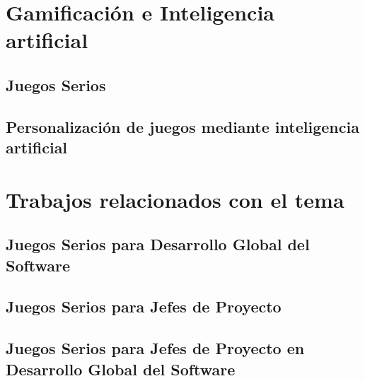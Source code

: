 \section{Gamificación e Inteligencia artificial}
\label{sec:Gamificacion}

\subsection{Juegos Serios}
\label{sec:JuegosSerios}

\subsection{Personalización de juegos mediante inteligencia artificial}
\label{sec:PersonalizacionJuegos}

\section{Trabajos relacionados con el tema}
\label{sec:TrabajosRelacionados}

\subsection{Juegos Serios para Desarrollo Global del Software}
\label{sec:JuegosSeriosDGS}

\subsection{Juegos Serios para Jefes de Proyecto}
\label{sec:JuegosSeriosJP}

\subsection{Juegos Serios para Jefes de Proyecto en Desarrollo Global del Software}
\label{sec:JuegosSeriosJPDGS}
